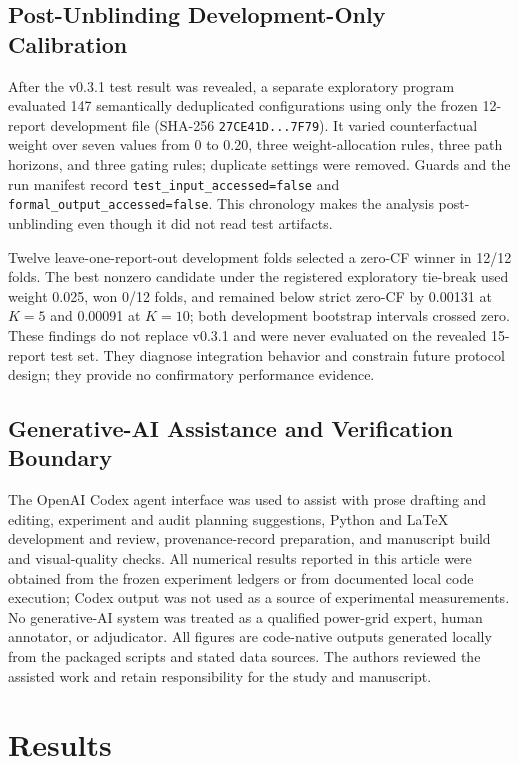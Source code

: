 \documentclass[applsci,article,submit,moreauthors]{Definitions/mdpi}
\begin{document}
\subsection{Post-Unblinding Development-Only Calibration}

After the v0.3.1 test result was revealed, a separate exploratory program evaluated 147 semantically deduplicated configurations using only the frozen 12-report development file (SHA-256 \texttt{27CE41D...7F79}). It varied counterfactual weight over seven values from 0 to 0.20, three weight-allocation rules, three path horizons, and three gating rules; duplicate settings were removed. Guards and the run manifest record \texttt{test\_input\_accessed=false} and \texttt{formal\_output\_accessed=false}. This chronology makes the analysis post-unblinding even though it did not read test artifacts.

Twelve leave-one-report-out development folds selected a zero-CF winner in 12/12 folds. The best nonzero candidate under the registered exploratory tie-break used weight 0.025, won 0/12 folds, and remained below strict zero-CF by 0.00131 at $K=5$ and 0.00091 at $K=10$; both development bootstrap intervals crossed zero. These findings do not replace v0.3.1 and were never evaluated on the revealed 15-report test set. They diagnose integration behavior and constrain future protocol design; they provide no confirmatory performance evidence.

\subsection{Generative-AI Assistance and Verification Boundary}

The OpenAI Codex agent interface was used to assist with prose drafting and editing, experiment and audit planning suggestions, Python and \LaTeX{} development and review, provenance-record preparation, and manuscript build and visual-quality checks. All numerical results reported in this article were obtained from the frozen experiment ledgers or from documented local code execution; Codex output was not used as a source of experimental measurements. No generative-AI system was treated as a qualified power-grid expert, human annotator, or adjudicator. All figures are code-native outputs generated locally from the packaged scripts and stated data sources. The authors reviewed the assisted work and retain responsibility for the study and manuscript.

\section{Results}
\end{document}
